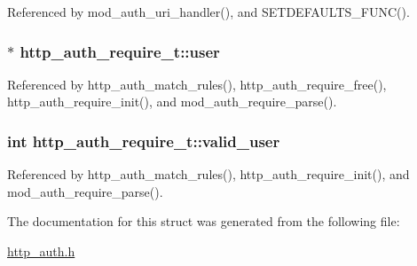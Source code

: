 Referenced by mod\-\_\-auth\-\_\-uri\-\_\-handler(), and S\-E\-T\-D\-E\-F\-A\-U\-L\-T\-S\-\_\-\-F\-U\-N\-C().

\hypertarget{structhttp__auth__require__t_a852fde18e5fca4b85de09b1fab2aadb0}{
\subsubsection[{user}]{$\ast$ http\-\_\-auth\-\_\-require\-\_\-t\-::user}}\label{structhttp__auth__require__t_a852fde18e5fca4b85de09b1fab2aadb0}


Referenced by http\-\_\-auth\-\_\-match\-\_\-rules(), http\-\_\-auth\-\_\-require\-\_\-free(), http\-\_\-auth\-\_\-require\-\_\-init(), and mod\-\_\-auth\-\_\-require\-\_\-parse().

\hypertarget{structhttp__auth__require__t_a939171e2f0f71928f4b93aa91e83b459}{
\subsubsection[{valid\-\_\-user}]{\setlength{\rightskip}{0pt plus 5cm}int http\-\_\-auth\-\_\-require\-\_\-t\-::valid\-\_\-user}}\label{structhttp__auth__require__t_a939171e2f0f71928f4b93aa91e83b459}


Referenced by http\-\_\-auth\-\_\-match\-\_\-rules(), http\-\_\-auth\-\_\-require\-\_\-init(), and mod\-\_\-auth\-\_\-require\-\_\-parse().



The documentation for this struct was generated from the following file\-:\begin{DoxyCompactItemize}
\item 
\hyperlink{http__auth_8h}{http\-\_\-auth.\-h}\end{DoxyCompactItemize}

